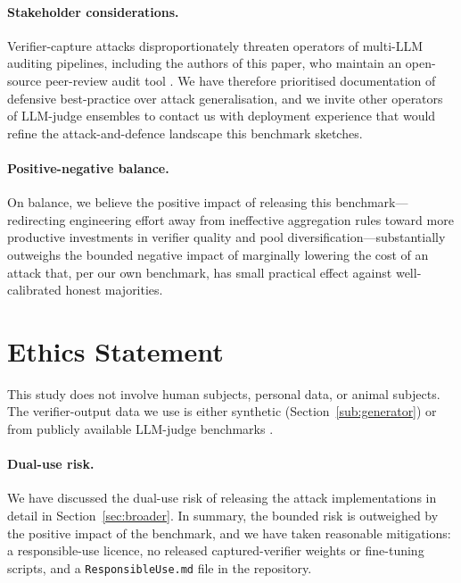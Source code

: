 \documentclass[11pt]{article}
\begin{document}
\paragraph{Stakeholder considerations.}
Verifier-capture attacks disproportionately threaten operators of
multi-LLM auditing pipelines, including the authors of this paper,
who maintain an open-source peer-review audit tool
\citep{liu2026paperreviewtoolkit}. We have therefore prioritised
documentation of defensive best-practice over attack
generalisation, and we invite other operators of LLM-judge ensembles
to contact us with deployment experience that would refine the
attack-and-defence landscape this benchmark sketches.

\paragraph{Positive-negative balance.}
On balance, we believe the positive impact of releasing this
benchmark---redirecting engineering effort away from ineffective
aggregation rules toward more productive investments in verifier
quality and pool diversification---substantially outweighs the
bounded negative impact of marginally lowering the cost of an
attack that, per our own benchmark, has small practical effect
against well-calibrated honest majorities.

\section{Ethics Statement}
\label{sec:ethics}

This study does not involve human subjects, personal data, or animal
subjects. The verifier-output data we use is either synthetic
(Section~\ref{sub:generator}) or from publicly available LLM-judge
benchmarks \citep{leung2026rubricllm,zhang2026blindcurator}.

\paragraph{Dual-use risk.}
We have discussed the dual-use risk of releasing the attack
implementations in detail in Section~\ref{sec:broader}. In summary,
the bounded risk is outweighed by the positive impact of the
benchmark, and we have taken reasonable mitigations: a
responsible-use licence, no released captured-verifier weights or
fine-tuning scripts, and a \texttt{ResponsibleUse.md} file in the
repository.
\end{document}
